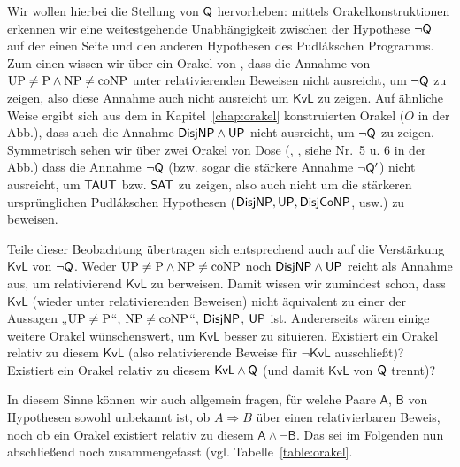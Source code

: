 Wir wollen hierbei die Stellung von $\mathsf{Q}$ hervorheben: mittels Orakelkonstruktionen erkennen wir eine weitestgehende Unabhängigkeit zwischen der Hypothese $\neg\mathsf{Q}$ auf der einen Seite und den anderen Hypothesen des Pudlákschen Programms. Zum einen wissen wir 
über ein Orakel von \textcite[Thm.~12.3, Nr.~8 in der Abb.]{fenner_inverting_2003}, dass die Annahme von $\mathrm{UP}\neq\mathrm{P}\land \mathrm{NP}\neq\mathrm{coNP}$ unter relativierenden Beweisen nicht ausreicht, um $\neg\mathsf{Q}$ zu zeigen, also diese Annahme auch nicht ausreicht um $\mathsf{KvL}$ zu zeigen.
Auf ähnliche Weise ergibt sich aus dem in Kapitel~\ref{chap:orakel} konstruierten Orakel ($O$ in der Abb.), dass auch die Annahme $\mathsf{DisjNP}\land\mathsf{UP}$ nicht ausreicht, um $\neg\mathsf{Q}$ zu zeigen.
Symmetrisch sehen wir über zwei Orakel von Dose (\cite*[Cor.~3.3]{dose_oracle_2020}, \cite*[Thm.~3.2]{dose_further_2020}, siehe Nr.~5 u. 6 in der Abb.) dass die Annahme $\neg\mathsf{Q}$ (bzw. sogar die stärkere Annahme $\neg\mathsf{Q}'$) nicht ausreicht, um $\mathsf{TAUT}$ bzw. $\mathsf{SAT}$ zu zeigen, also auch nicht um die stärkeren ursprünglichen Pudlákschen Hypothesen ($\mathsf{DisjNP}, \mathsf{UP}, \mathsf{DisjCoNP}$, usw.) zu beweisen.

Teile dieser Beobachtung übertragen sich entsprechend auch auf die Verstärkung $\mathsf{KvL}$ von $\neg\mathsf{Q}$. Weder $\mathrm{UP}\neq\mathrm{P}\land \mathrm{NP}\neq\mathrm{coNP}$ noch $\mathsf{DisjNP}\land\mathsf{UP}$ reicht als Annahme aus, um relativierend $\mathsf{KvL}$ zu berweisen.
Damit wissen wir zumindest schon, dass $\mathsf{KvL}$ (wieder unter relativierenden Beweisen) nicht äquivalent zu einer der Aussagen „$\mathrm{UP}\neq \mathrm{P}$“, $\mathrm{NP}\neq\mathrm{coNP}$“, $\mathsf{DisjNP}$, $\mathsf{UP}$ ist.
Andererseits wären einige weitere Orakel wünschenswert, um $\mathsf{KvL}$ besser zu situieren. Existiert ein Orakel relativ zu diesem $\mathsf{KvL}$ (also relativierende Beweise für $\neg\mathsf{KvL}$ ausschließt)? Existiert ein Orakel relativ zu diesem $\mathsf{KvL}\land \mathsf{Q}$ (und damit $\mathsf{KvL}$ von $\mathsf{Q}$ trennt)? 

In diesem Sinne können wir auch allgemein fragen, für welche Paare $\mathsf{A}$, $\mathsf{B}$ von Hypothesen sowohl unbekannt ist, ob $A\Rightarrow B$ über einen relativierbaren Beweis, noch ob ein Orakel existiert relativ zu diesem $\mathsf{A\land \neg B}$.
Das sei im Folgenden nun abschließend noch zusammengefasst (vgl. Tabelle~\ref{table:orakel}.

